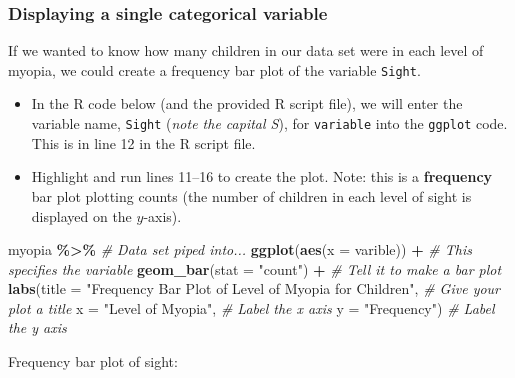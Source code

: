 \documentclass[
]{report}
\newenvironment{Shaded}{\begin{snugshade}}{\end{snugshade}}
\newcommand{\AttributeTok}[1]{\textcolor[rgb]{0.13,0.29,0.53}{#1}}
\newcommand{\CommentTok}[1]{\textcolor[rgb]{0.56,0.35,0.01}{\textit{#1}}}
\newcommand{\FunctionTok}[1]{\textcolor[rgb]{0.13,0.29,0.53}{\textbf{#1}}}
\newcommand{\NormalTok}[1]{#1}
\newcommand{\SpecialCharTok}[1]{\textcolor[rgb]{0.81,0.36,0.00}{\textbf{#1}}}
\newcommand{\StringTok}[1]{\textcolor[rgb]{0.31,0.60,0.02}{#1}}
\begin{document}
\hypertarget{displaying-a-single-categorical-variable}{%
\subsubsection*{Displaying a single categorical variable}\label{displaying-a-single-categorical-variable}}

If we wanted to know how many children in our data set were in each level of myopia, we could create a frequency bar plot of the variable \texttt{Sight}.

\begin{itemize}
\item
  In the R code below (and the provided R script file), we will enter the variable name, \texttt{Sight} (\emph{note the capital S}), for \texttt{variable} into the \texttt{ggplot} code. This is in line 12 in the R script file.
\item
  Highlight and run lines 11--16 to create the plot. Note: this is a \textbf{frequency} bar plot plotting counts (the number of children in each level of sight is displayed on the \(y\)-axis).
\end{itemize}

\begin{Shaded}
\begin{Highlighting}[]
\NormalTok{myopia }\SpecialCharTok{\%\textgreater{}\%} \CommentTok{\# Data set piped into...}
\FunctionTok{ggplot}\NormalTok{(}\FunctionTok{aes}\NormalTok{(}\AttributeTok{x =}\NormalTok{ varible)) }\SpecialCharTok{+}   \CommentTok{\# This specifies the variable}
  \FunctionTok{geom\_bar}\NormalTok{(}\AttributeTok{stat =} \StringTok{"count"}\NormalTok{) }\SpecialCharTok{+}  \CommentTok{\# Tell it to make a bar plot}
  \FunctionTok{labs}\NormalTok{(}\AttributeTok{title =} \StringTok{"Frequency Bar Plot of Level of Myopia for Children"}\NormalTok{,  }
       \CommentTok{\# Give your plot a title}
       \AttributeTok{x =} \StringTok{"Level of Myopia"}\NormalTok{,   }\CommentTok{\# Label the x axis}
       \AttributeTok{y =} \StringTok{"Frequency"}\NormalTok{)  }\CommentTok{\# Label the y axis}
\end{Highlighting}
\end{Shaded}

\newpage

Frequency bar plot of sight:
\end{document}
